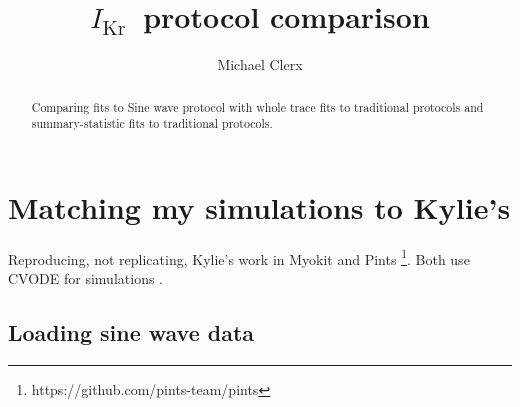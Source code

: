 \documentclass[preprint,authoryear,10pt]{elsarticle}
\newcommand{\ikr}{{$I_\text{Kr}$}}
\begin{document}
\begin{frontmatter}

\title{\ikr\ protocol comparison}

\author[csaddress]{Michael Clerx}






\address[csaddress]{Computational Biology,
    Department of Computer Science,
    University of Oxford,
    Oxford,
    UK}

\address[ucladdress]{Research IT Services,
    University College London,
    London,
    UK}

\address[notaddress]{Centre for Mathematical Medicine \& Biology,
    School of Mathematical Sciences,\\
    University of Nottingham,
    Nottingham,
    UK}



%
%
%
%
\begin{abstract}
Comparing fits to Sine wave protocol with whole trace fits to traditional
protocols and summary-statistic fits to traditional protocols.
\end{abstract}

\end{frontmatter}


\linenumbers
\newpage










%
%
%
%
\section{Matching my simulations to Kylie's}

Reproducing, not replicating, Kylie's work \citep{Beattie2017Sines} in Myokit
 \citep{Clerx2016Myokit} and Pints
 \footnote{https://github.com/pints-team/pints}.
Both use CVODE for simulations \citep{Hindmarsh2005Sundials}.



\subsection{Loading sine wave data}
\end{document}
